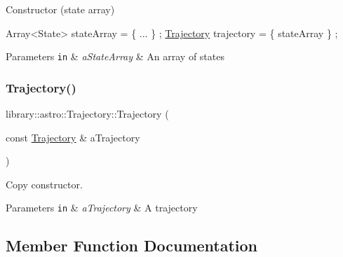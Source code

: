 Constructor (state array) 


\begin{DoxyCode}
Array<State> stateArray = \{ ... \} ;
\hyperlink{classlibrary_1_1astro_1_1_trajectory_a8e5c7740915ca947e067c0f419ac1c65}{Trajectory} trajectory = \{ stateArray \} ;
\end{DoxyCode}



\begin{DoxyParams}[1]{Parameters}
\mbox{\tt in}  & {\em a\+State\+Array} & An array of states \\
\hline
\end{DoxyParams}
\mbox{\label{classlibrary_1_1astro_1_1_trajectory_a63aa2162979ed09fedded192871f0f0a}} 
\subsubsection{\texorpdfstring{Trajectory()}{Trajectory()}\hspace{0.1cm}{\footnotesize\ttfamily [3/3]}}
{\footnotesize\ttfamily library\+::astro\+::\+Trajectory\+::\+Trajectory (\begin{DoxyParamCaption}\item[{const \hyperlink{classlibrary_1_1astro_1_1_trajectory}{Trajectory} \&}]{a\+Trajectory }\end{DoxyParamCaption})}



Copy constructor. 


\begin{DoxyParams}[1]{Parameters}
\mbox{\tt in}  & {\em a\+Trajectory} & A trajectory \\
\hline
\end{DoxyParams}


\subsection{Member Function Documentation}
\mbox{\label{classlibrary_1_1astro_1_1_trajectory_ac5ebd6f282b52bb3d7c74a79375025e1}} 
